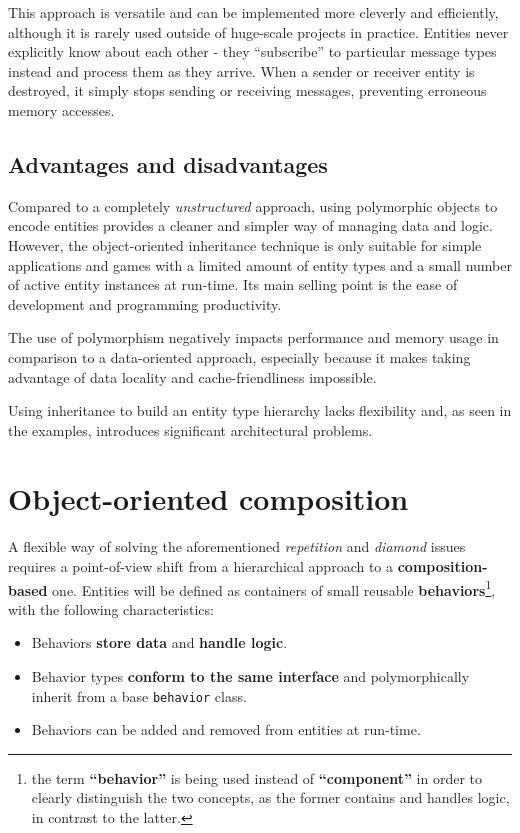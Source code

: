 \documentclass[twoside, 12pt, a4paper, openany]{book}
\begin{document}
This approach is versatile and can be implemented more cleverly and
efficiently, although it is rarely used outside of huge-scale projects
in practice. Entities never explicitly know about each other - they
``subscribe'' to particular message types instead and process them as
they arrive. When a sender or receiver entity is destroyed, it simply
stops sending or receiving messages, preventing erroneous memory
accesses.

\subsection{Advantages and
disadvantages}\label{advantages-and-disadvantages}

Compared to a completely \emph{unstructured} approach, using polymorphic
objects to encode entities provides a cleaner and simpler way of
managing data and logic. However, the object-oriented inheritance
technique is only suitable for simple applications and games with a
limited amount of entity types and a small number of active entity
instances at run-time. Its main selling point is the ease of development
and programming productivity.

The use of polymorphism negatively impacts performance and memory usage
in comparison to a data-oriented approach, especially because it makes
taking advantage of data locality and cache-friendliness impossible.

Using inheritance to build an entity type hierarchy lacks flexibility
and, as seen in the examples, introduces significant architectural
problems.

\section{Object-oriented composition}\label{object-oriented-composition}

A flexible way of solving the aforementioned \emph{repetition} and
\emph{diamond} issues requires a point-of-view shift from a hierarchical
approach to a \textbf{composition-based} one. Entities will be defined
as containers of small reusable \textbf{behaviors}\footnote{the term
  \textbf{``behavior''} is being used instead of \textbf{``component''}
  in order to clearly distinguish the two concepts, as the former
  contains and handles logic, in contrast to the latter.}, with the
following characteristics:

\begin{itemize}
\item
  Behaviors \textbf{store data} and \textbf{handle logic}.
\item
  Behavior types \textbf{conform to the same interface} and
  polymorphically inherit from a base
  \texttt{behavior}
  class.
\item
  Behaviors can be added and removed from entities at run-time.
\end{itemize}
\end{document}
